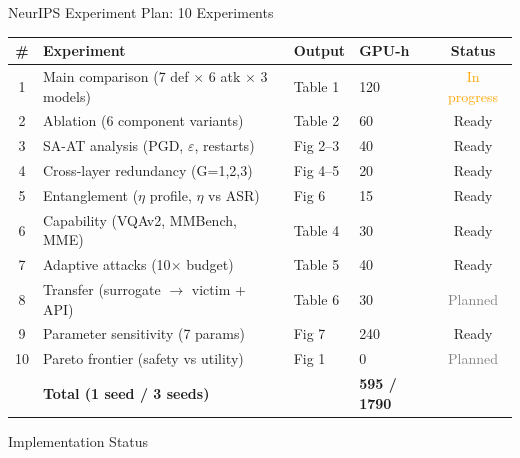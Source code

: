 \documentclass[aspectratio=169,12pt]{beamer}
\begin{document}
\begin{frame}{NeurIPS Experiment Plan: 10 Experiments}
\small
\begin{tabular}{clllc}
\toprule
\textbf{\#} & \textbf{Experiment} & \textbf{Output} & \textbf{GPU-h} & \textbf{Status} \\
\midrule
1 & Main comparison (7 def $\times$ 6 atk $\times$ 3 models) & Table 1 & 120 & \textcolor{orange}{In progress} \\
2 & Ablation (6 component variants) & Table 2 & 60 & \textcolor{safegreen}{Ready} \\
3 & SA-AT analysis (PGD, $\varepsilon$, restarts) & Fig 2--3 & 40 & \textcolor{safegreen}{Ready} \\
4 & Cross-layer redundancy (G=1,2,3) & Fig 4--5 & 20 & \textcolor{safegreen}{Ready} \\
5 & Entanglement ($\eta$ profile, $\eta$ vs ASR) & Fig 6 & 15 & \textcolor{safegreen}{Ready} \\
6 & Capability (VQAv2, MMBench, MME) & Table 4 & 30 & \textcolor{safegreen}{Ready} \\
7 & Adaptive attacks (10$\times$ budget) & Table 5 & 40 & \textcolor{safegreen}{Ready} \\
8 & Transfer (surrogate $\to$ victim + API) & Table 6 & 30 & \textcolor{gray}{Planned} \\
9 & Parameter sensitivity (7 params) & Fig 7 & 240 & \textcolor{safegreen}{Ready} \\
10 & Pareto frontier (safety vs utility) & Fig 1 & 0 & \textcolor{gray}{Planned} \\
\midrule
& \textbf{Total (1 seed / 3 seeds)} & & \textbf{595 / 1790} & \\
\bottomrule
\end{tabular}
\end{frame}

\begin{frame}{Implementation Status}
\centering
{}
\end{frame}
\end{document}
